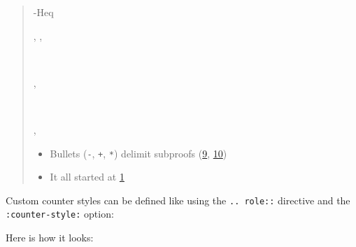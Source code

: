 \documentclass[a4paper]{article}
\begin{document}
\begin{quote}
\begin{alectryon}
\begin{sentence}
\begin{output}
\begin{goals}
\begin{goal}
\begin{hyps}
            \hyp{Heq}{~~~}
          \end{hyps}
          \sep
          \infrule{}
          \sep
          \begin{conclusion}
            ~~~~~~~~
          \end{conclusion}
        \end{goal}
      \end{goals}
    \end{output}
  \end{sentence}
  \sep
  \begin{sentence}
    \begin{input}
      ~~~~\nl
    \end{input}
  \end{sentence}
  \sep
  \begin{sentence}
    \begin{input}
    \end{input}
  \end{sentence}
\end{alectryon}

\begin{itemize}
\item Bullets (\texttt{-}, \texttt{+}, \texttt{*}) delimit subproofs (\hyperref[references-rst-io-setup-s-base-case-0]{9}, \hyperref[references-rst-induction-0]{10})

\item It all started at \hyperref[references-rst-fixpoint-plus-comm-0]{1}
\end{itemize}
\end{quote}

Custom counter styles can be defined like using the \texttt{.. role::} directive and the \texttt{:counter-style:} option:

Here is how it looks:
\end{document}
